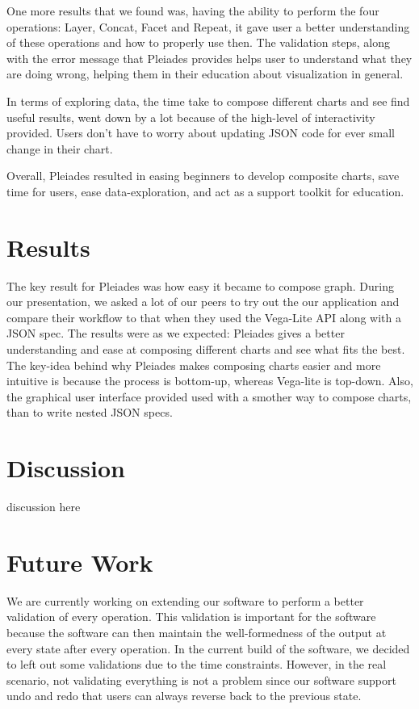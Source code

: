 \documentclass[journal]{vgtc}                %
\begin{document}
One more results that we found was, having the ability to perform the four operations: 
Layer, Concat, Facet and Repeat, it gave user a better understanding of these 
operations and how to properly use then. The validation steps, along with the 
error message that Pleiades provides helps user to understand what they are doing 
wrong, helping them in their education about visualization in general. 

In terms of exploring data, the time take to compose different charts and see 
find useful results, went down by a lot because of the high-level of interactivity 
provided. Users don’t have to worry about updating JSON code for ever 
small change in their chart.

Overall, Pleiades resulted in easing beginners to develop composite charts,
save time for users, ease data-exploration, and act as a support toolkit for education. 

\section{Results}

The key result for Pleiades was how easy it became to compose graph. During our presentation, 
we asked a lot of our peers to try out the our application and compare their workflow to that 
when they used the Vega-Lite API along with a JSON spec. The results were as we expected: 
Pleiades gives a better understanding and ease at composing different charts and see what fits the best.
The key-idea behind why Pleiades makes composing charts easier and more intuitive is because the 
process is bottom-up, whereas Vega-lite is top-down. Also, the graphical user interface provided 
used with a smother way to compose charts, than to write nested JSON specs. 

\section{Discussion}

discussion here

\section{Future Work}
We are currently working on extending our software to perform a better validation
of every operation. This validation is important for the software because the
software can then maintain the well-formedness of the output at every state after
every operation. In the current build of the software, we decided to left out some
validations due to the time constraints. However, in the real scenario, not validating
everything is not a problem since our software support undo and redo that users
can always reverse back to the previous state.
\end{document}
